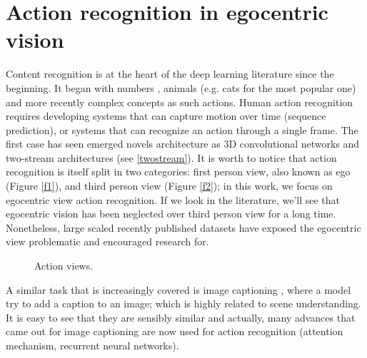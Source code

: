 \documentclass[12pt, a4paper]{report}
\begin{document}
	\chapter{Action recognition in egocentric vision}\label{ar}
		Content recognition is at the heart of the deep learning literature since the beginning. It began with numbers \cite{lecun_98}, animals (e.g. cats for the most popular one) and more recently complex concepts as such actions.
		Human action recognition requires developing systems that can capture motion over time (sequence prediction), or systems that can recognize an action through a single frame.
		The first case has seen emerged novels architecture as 3D convolutional networks \cite{ji} and two-stream architectures (see \ref{twostream}).
		It is worth to notice that action recognition is itself split in two categories: first person view, also known as \gls{ego} (Figure \ref{f1}), and third person view (Figure \ref{f2}); in this work, we focus on egocentric view action recognition.
		If we look in the literature, we'll see that egocentric vision has been neglected over third person view for a long time.
		Nonetheless, large scaled recently published datasets have exposed the egocentric view problematic and encouraged research for.
		\begin{figure}[!tbp]
			\centering
			\hfill
			\caption{Action views.}
		\end{figure}
		A similar task that is increasingly covered is image captioning \cite{xu}, where a model try to add a caption to an image; which is highly related to scene understanding.
		It is easy to see that they are sensibly similar and actually, many advances that came out for image captioning are now used for action recognition (attention mechanism, recurrent neural networks).
\end{document}
